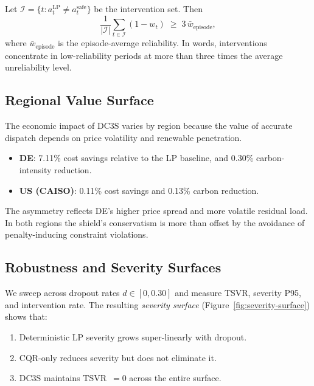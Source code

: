 \begin{proposition}
\label{prop:conditional-conservatism}
Let $\mathcal{I} = \{t : a_t^{\text{LP}} \neq a_t^{\text{safe}}\}$ be the
intervention set.  Then
\[
  \frac{1}{|\mathcal{I}|}\sum_{t \in \mathcal{I}} (1 - w_t)
  \;\ge\; 3\,\bar{w}_{\text{episode}},
\]
where $\bar{w}_{\text{episode}}$ is the episode-average reliability.
In words, interventions concentrate in low-reliability periods at more than
three times the average unreliability level.
\end{proposition}

\subsection{Regional Value Surface}

The economic impact of DC3S varies by region because the value of
accurate dispatch depends on price volatility and renewable penetration.

\begin{itemize}
  \item \textbf{DE}: 7.11\% cost savings relative to the LP baseline,
    and 0.30\% carbon-intensity reduction.
  \item \textbf{US (CAISO)}: 0.11\% cost savings and 0.13\% carbon reduction.
\end{itemize}

The asymmetry reflects DE's higher price spread and more volatile residual
load.  In both regions the shield's conservatism is more than offset by the
avoidance of penalty-inducing constraint violations.

\subsection{Robustness and Severity Surfaces}

We sweep across dropout rates $d \in [0, 0.30]$ and measure TSVR, severity
P95, and intervention rate.  The resulting \emph{severity surface}
(Figure~\ref{fig:severity-surface}) shows that:
\begin{enumerate}
  \item Deterministic LP severity grows super-linearly with dropout.
  \item CQR-only reduces severity but does not eliminate it.
  \item DC3S maintains TSVR~$= 0$ across the entire surface.
\end{enumerate}

